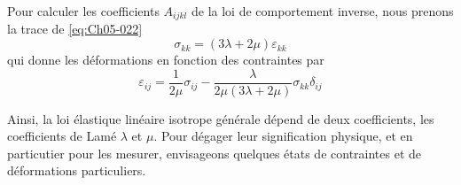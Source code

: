 Pour calculer les coefficients $A_{ijkl}$ de la loi de comportement inverse, nous prenons la trace de  \eqref{eq:Ch05-022}
\begin{equation}
    \sigma_{kk} = \left( 3 \lambda + 2\mu \right) \varepsilon_{kk}
    \label{eq:Ch05-026}
\end{equation}
qui donne les déformations en fonction des contraintes par 
\begin{equation}
    \varepsilon_{ij} = \frac{1}{2\mu} \sigma_{ij} - \frac{\lambda}{2\mu \left( 3\lambda + 2 \mu \right)}\sigma_{kk} \delta_{ij}
    \label{eq:Ch05-027}
\end{equation}

Ainsi, la loi élastique linéaire isotrope générale dépend de deux coefficients, les coefficients de Lamé $\lambda$ et $\mu$.
Pour dégager leur signification physique, et en particutier pour les mesurer, envisageons quelques états de contraintes et de déformations particuliers.
